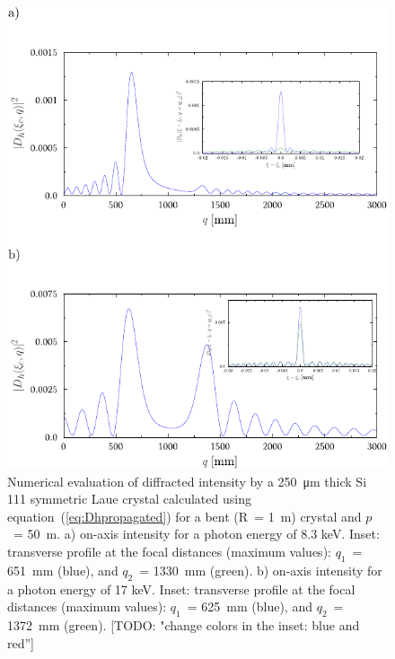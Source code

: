 \documentclass[preprint]{iucr}              %
\newcommand{\todo}[1]{{\color{red}[TODO: "#1'']}}
\begin{document}
\begin{figure}
\label{fig:8keV}
\caption{Numerical evaluation of diffracted intensity by a \SI{250}{\micro\meter} thick Si 111 symmetric Laue crystal calculated using equation~(\ref{eq:Dhpropagated}) for a bent (R~= \SI{1}{\meter}) crystal and $p$~= \SI{50}{\meter}. 
a) on-axis intensity for a photon energy of 8.3 keV. 
Inset: transverse profile at the focal distances (maximum values):  
$q_1$~= \SI{651}{\milli\meter} (blue), and
$q_2$~= \SI{1330}{\milli\meter} (green).
b) on-axis intensity for a photon energy of 17 keV.
Inset: transverse profile at the focal distances (maximum values):
$q_1$~= \SI{625}{\milli\meter} (blue), and 
$q_2$~= \SI{1372}{\milli\meter} (green).
\todo{change colors in the inset: blue and red}
}
\includegraphics[width=1\textwidth]{fig5.pdf}





\end{figure}
\end{document}
